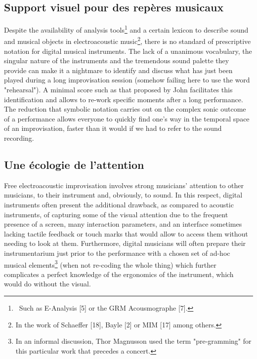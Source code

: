 \subsection{Support visuel pour des repères musicaux}

Despite the availability of analysis tools\footnote{ Such as E-Analysis [5] or the GRM Acousmographe [7].} and a certain lexicon to describe sound and musical objects in electroacoustic music\footnote{In the work of Schaeffer [18], Bayle [2] or MIM [17] among others.}, there is no standard of prescriptive notation for digital musical instruments. The lack of a unanimous vocabulary, the singular nature of the instruments and the tremendous sound palette they provide can make it a nightmare to identify and discuss what has just been played during a long improvisation session (somehow failing here to use the word "rehearsal"). A minimal score such as that proposed by John facilitates this identification and allows to re-work specific moments after a long performance. The reduction that symbolic notation carries out on the complex sonic outcome of a performance allows everyone to quickly find one's way in the temporal space of an improvisation, faster than it would if we had to refer to the sound recording.

\subsection{Une écologie de l'attention}

Free electroacoustic improvisation involves strong musicians' attention to other musicians, to their instrument and, obviously, to sound. In this respect, digital instruments often present the additional drawback, as compared to acoustic instruments, of capturing some of the visual attention due to the frequent presence of a screen, many interaction parameters, and an interface sometimes lacking tactile feedback or touch marks that would allow to access them without needing to look at them. Furthermore, digital musicians will often prepare their instrumentarium just prior to the performance with a chosen set of ad-hoc musical elements\footnote{In an informal discussion, Thor Magnusson used the term "pre-gramming" for this particular work that precedes a concert.} (when not re-coding the whole thing) which further complicates a perfect knowledge of the ergonomics of the instrument, which would do without the visual.

